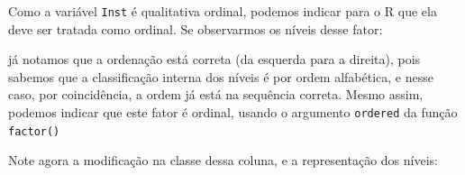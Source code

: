 \documentclass[10pt,a4paper]{book}
\newenvironment{Shaded}{\begin{snugshade}}{\end{snugshade}}
\newcommand{\KeywordTok}[1]{\textcolor[rgb]{0.13,0.29,0.53}{\textbf{#1}}}
\newcommand{\DataTypeTok}[1]{\textcolor[rgb]{0.13,0.29,0.53}{#1}}
\newcommand{\DecValTok}[1]{\textcolor[rgb]{0.00,0.00,0.81}{#1}}
\newcommand{\StringTok}[1]{\textcolor[rgb]{0.31,0.60,0.02}{#1}}
\newcommand{\OtherTok}[1]{\textcolor[rgb]{0.56,0.35,0.01}{#1}}
\newcommand{\OperatorTok}[1]{\textcolor[rgb]{0.81,0.36,0.00}{\textbf{#1}}}
\newcommand{\NormalTok}[1]{#1}
\begin{document}
Como a variável \texttt{Inst} é qualitativa ordinal, podemos indicar
para o R que ela deve ser tratada como ordinal. Se observarmos os níveis
desse fator:

\begin{Shaded}
\end{Shaded}

já notamos que a ordenação está correta (da esquerda para a direita),
pois sabemos que a classificação interna dos níveis é por ordem
alfabética, e nesse caso, por coincidência, a ordem já está na sequência
correta. Mesmo assim, podemos indicar que este fator é ordinal, usando o
argumento \texttt{ordered} da função \texttt{factor()}

\begin{Shaded}
\end{Shaded}

Note agora a modificação na classe dessa coluna, e a representação dos
níveis:

\begin{Shaded}
\end{Shaded}
\end{document}
